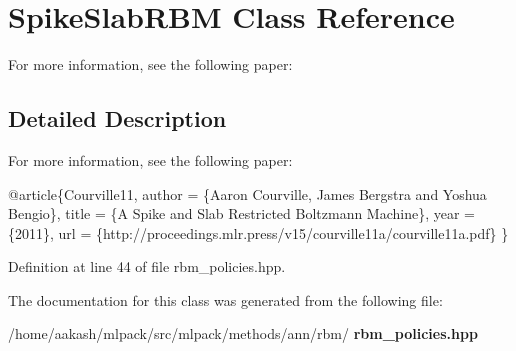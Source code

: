 \section{Spike\+Slab\+R\+BM Class Reference}
\label{classmlpack_1_1ann_1_1SpikeSlabRBM}


For more information, see the following paper\+:  




\subsection{Detailed Description}
For more information, see the following paper\+: 


\begin{DoxyCode}
@article\{Courville11,
  author  = \{Aaron Courville, James Bergstra and Yoshua Bengio\},
  title   = \{A Spike and Slab Restricted Boltzmann Machine\},
  year    = \{2011\},
  url     = \{http:\textcolor{comment}{//proceedings.mlr.press/v15/courville11a/courville11a.pdf\}}
\}
\end{DoxyCode}
 

Definition at line 44 of file rbm\+\_\+policies.\+hpp.



The documentation for this class was generated from the following file\+:\begin{DoxyCompactItemize}
\item 
/home/aakash/mlpack/src/mlpack/methods/ann/rbm/\textbf{ rbm\+\_\+policies.\+hpp}\end{DoxyCompactItemize}
